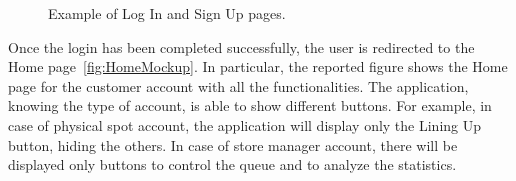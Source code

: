 \begin{figure}[H]
	\centering     %
	\caption{Example of Log In and Sign Up pages.}
\end{figure}

Once the login has been completed successfully, the user is redirected to the Home page~\ref{fig:HomeMockup}.
In particular, the reported figure shows the Home page for the customer account with all the functionalities. The application, knowing the type of account, is able to show different buttons. For example, in case of physical spot account, the application will display only the Lining Up button, hiding the others. In case of store manager account, there will be displayed only buttons to control the queue and to analyze the statistics. 


